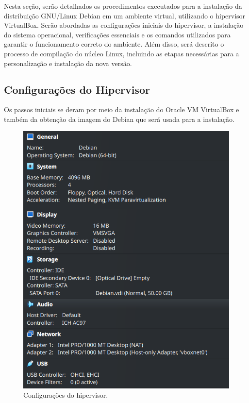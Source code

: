 \documentclass[
	12pt,				%
	oneside,   	        %
	a4paper,			%
	english,			%
	french,				%
	spanish,			%
	brazil,				%
	]{pacotes/abntex2}
\begin{document}
Nesta seção, serão detalhados os procedimentos executados para a instalação da distribuição GNU/Linux Debian em um ambiente virtual, utilizando o hipervisor VirtualBox. Serão abordadas as configurações iniciais do hipervisor, a instalação do sistema operacional, verificações essenciais e os comandos utilizados para garantir o funcionamento correto do ambiente. Além disso, será descrito o processo de compilação do núcleo Linux, incluindo as etapas necessárias para a personalização e instalação da nova versão. 

\subsection{Configurações do Hipervisor}
\label{subsec:hipervisor}

Os passos iniciais se deram por meio da instalação do Oracle VM VirtualBox e também da obtenção da imagem do Debian que será usada para a instalação. 

\begin{figure}[H]
  \centering
  \includegraphics[scale=0.7]{figuras/vm.png}
  \caption{Configurações do hipervisor.}
  \label{fig:vm}
\end{figure}
\end{document}
